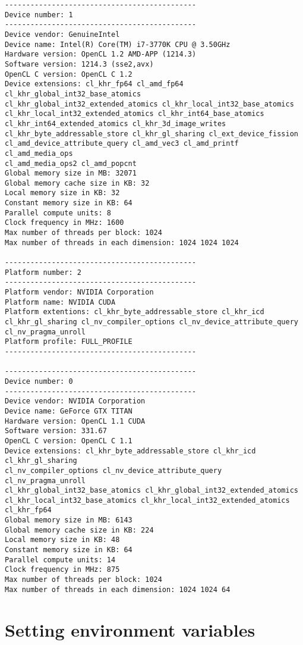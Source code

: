 \begin{verbatim}
---------------------------------------------
Device number: 1
---------------------------------------------
Device vendor: GenuineIntel
Device name: Intel(R) Core(TM) i7-3770K CPU @ 3.50GHz
Hardware version: OpenCL 1.2 AMD-APP (1214.3)
Software version: 1214.3 (sse2,avx)
OpenCL C version: OpenCL C 1.2 
Device extensions: cl_khr_fp64 cl_amd_fp64 cl_khr_global_int32_base_atomics 
cl_khr_global_int32_extended_atomics cl_khr_local_int32_base_atomics 
cl_khr_local_int32_extended_atomics cl_khr_int64_base_atomics 
cl_khr_int64_extended_atomics cl_khr_3d_image_writes 
cl_khr_byte_addressable_store cl_khr_gl_sharing cl_ext_device_fission 
cl_amd_device_attribute_query cl_amd_vec3 cl_amd_printf cl_amd_media_ops 
cl_amd_media_ops2 cl_amd_popcnt 
Global memory size in MB: 32071
Global memory cache size in KB: 32
Local memory size in KB: 32
Constant memory size in KB: 64
Parallel compute units: 8
Clock frequency in MHz: 1600
Max number of threads per block: 1024
Max number of threads in each dimension: 1024 1024 1024

---------------------------------------------
Platform number: 2
---------------------------------------------
Platform vendor: NVIDIA Corporation
Platform name: NVIDIA CUDA
Platform extentions: cl_khr_byte_addressable_store cl_khr_icd 
cl_khr_gl_sharing cl_nv_compiler_options cl_nv_device_attribute_query 
cl_nv_pragma_unroll 
Platform profile: FULL_PROFILE
---------------------------------------------

---------------------------------------------
Device number: 0
---------------------------------------------
Device vendor: NVIDIA Corporation
Device name: GeForce GTX TITAN
Hardware version: OpenCL 1.1 CUDA
Software version: 331.67
OpenCL C version: OpenCL C 1.1 
Device extensions: cl_khr_byte_addressable_store cl_khr_icd cl_khr_gl_sharing 
cl_nv_compiler_options cl_nv_device_attribute_query cl_nv_pragma_unroll  
cl_khr_global_int32_base_atomics cl_khr_global_int32_extended_atomics 
cl_khr_local_int32_base_atomics cl_khr_local_int32_extended_atomics cl_khr_fp64 
Global memory size in MB: 6143
Global memory cache size in KB: 224
Local memory size in KB: 48
Constant memory size in KB: 64
Parallel compute units: 14
Clock frequency in MHz: 875
Max number of threads per block: 1024
Max number of threads in each dimension: 1024 1024 64

\end{verbatim}

\section{Setting environment variables}

